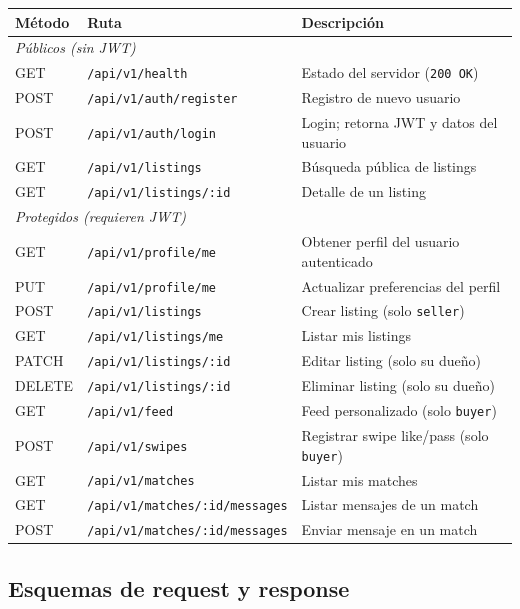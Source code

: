 \documentclass[12pt,a4paper]{article}
\begin{document}
\begin{longtable}{lll}
  \toprule
  \textbf{Método} & \textbf{Ruta} & \textbf{Descripción} \\
  \midrule
  \endhead
  \multicolumn{3}{l}{\small\textit{Públicos (sin JWT)}} \\[3pt]
  GET    & \texttt{/api/v1/health}               & Estado del servidor (\texttt{200 OK}) \\
  POST   & \texttt{/api/v1/auth/register}        & Registro de nuevo usuario \\
  POST   & \texttt{/api/v1/auth/login}           & Login; retorna JWT y datos del usuario \\
  GET    & \texttt{/api/v1/listings}             & Búsqueda pública de listings \\
  GET    & \texttt{/api/v1/listings/:id}         & Detalle de un listing \\
  \midrule
  \multicolumn{3}{l}{\small\textit{Protegidos (requieren JWT)}} \\[3pt]
  GET    & \texttt{/api/v1/profile/me}           & Obtener perfil del usuario autenticado \\
  PUT    & \texttt{/api/v1/profile/me}           & Actualizar preferencias del perfil \\
  POST   & \texttt{/api/v1/listings}             & Crear listing (solo \texttt{seller}) \\
  GET    & \texttt{/api/v1/listings/me}          & Listar mis listings \\
  PATCH  & \texttt{/api/v1/listings/:id}         & Editar listing (solo su dueño) \\
  DELETE & \texttt{/api/v1/listings/:id}         & Eliminar listing (solo su dueño) \\
  GET    & \texttt{/api/v1/feed}                 & Feed personalizado (solo \texttt{buyer}) \\
  POST   & \texttt{/api/v1/swipes}               & Registrar swipe like/pass (solo \texttt{buyer}) \\
  GET    & \texttt{/api/v1/matches}              & Listar mis matches \\
  GET    & \texttt{/api/v1/matches/:id/messages} & Listar mensajes de un match \\
  POST   & \texttt{/api/v1/matches/:id/messages} & Enviar mensaje en un match \\
  \bottomrule
\end{longtable}

\subsection{Esquemas de request y response}
\end{document}
